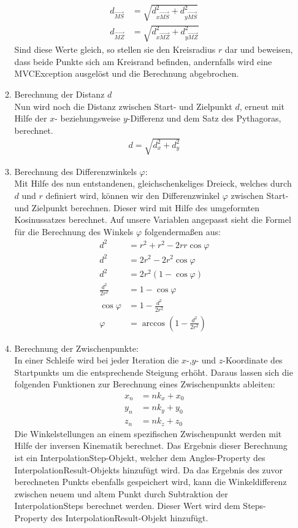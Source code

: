 \begin{itemize}
\begin{enumerate}
\begin{align*}
d_{\overrightarrow{MS}} & = \sqrt{d_{x\overrightarrow{MS}}^2 + d_{y\overrightarrow{MS}}^2}\\
d_{\overrightarrow{MZ}} & = \sqrt{d_{x\overrightarrow{MZ}}^2 + d_{y\overrightarrow{MZ}}^2}
\end{align*}
Sind diese Werte gleich, so stellen sie den Kreisradius $r$ dar und beweisen, dass beide Punkte sich am Kreisrand befinden, andernfalls wird eine MVCException ausgelöst und die Berechnung abgebrochen. 
\item Berechnung der Distanz $d$\\
Nun wird noch die Distanz zwischen Start- und Zielpunkt $d$, erneut mit Hilfe der $x$- beziehungsweise $y$-Differenz und dem Satz des Pythagoras, berechnet.
\begin{align*}
d = \sqrt{d_x^2 + d_y^2}
\end{align*}
\item Berechnung des Differenzwinkels $\varphi$:\\
Mit Hilfe des nun entstandenen, gleichschenkeliges Dreieck, welches durch $d$ und $r$ definiert wird, können wir den Differenzwinkel $\varphi$ zwischen Start- und Zielpunkt berechnen. Dieser wird mit Hilfe des umgeformten Kosinussatzes berechnet. Auf unsere Variablen angepasst sieht die Formel für die Berechnung des Winkels $\varphi$ folgendermaßen aus:
\begin{align*}
d^2 & = r^2 + r^2 - 2rr \cos \varphi \\
d^2 & = 2r^2 - 2r^2 \cos \varphi \\
d^2 & = 2r^2(1 - \cos \varphi) \\
\frac{d^2}{2r^2} & = 1 - \cos \varphi \\
\cos \varphi & = 1 - \frac{d^2}{2r^2} \\
\varphi & = \arccos (1 - \frac{d^2}{2r^2})
\end{align*}
\item Berechnung der Zwischenpunkte:\\
In einer Schleife wird bei jeder Iteration die $x$-,$y$- und $z$-Koordinate des Startpunkts um die entsprechende Steigung erhöht. Daraus lassen sich die folgenden Funktionen zur Berechnung eines Zwischenpunkts ableiten:
\begin{align*}
x_n & = n k_x + x_0\\
y_n & =  n k_y + y_0\\
z_n & = n k_z + z_0 
\end{align*}
Die Winkelstellungen an einem spezifischen Zwischenpunkt werden mit Hilfe der inversen Kinematik berechnet. Das Ergebnis dieser Berechnung ist ein InterpolationStep-Objekt, welcher dem Angles-Property des InterpolationResult-Objekts hinzufügt wird. Da das Ergebnis des zuvor berechneten Punkts ebenfalls gespeichert wird, kann die Winkeldifferenz zwischen neuem und altem Punkt durch Subtraktion der InterpolationSteps berechnet werden. Dieser Wert wird dem Steps-Property des InterpolationResult-Objekt hinzufügt.

\end{enumerate}
\end{itemize}
